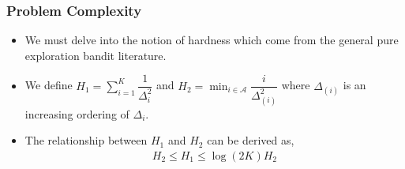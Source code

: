\begin{frame}
\frametitle{Problem Complexity}
\begin{itemize}
\item<1-> We must delve into the notion of hardness which come from the general pure exploration bandit literature.
\item<2-> We define $H_{1} = \sum_{i=1}^{K}\dfrac{1}{\Delta_{i}^{2}}$ and $
H_{2} =\min_{i\in \mathcal{A}}\dfrac{i}{{\Delta_{(i)}^{2}}} $ where $\Delta_{(i)}$ is an increasing ordering of ${\Delta}_{i}$.
%
\item<3-> The relationship between $H_1$ and $H_2$ can be derived as,
\begin{align*}
H_{2} \leq H_{1}\leq \log(2K)H_{2} 
\end{align*}
\end{itemize}
\end{frame}

